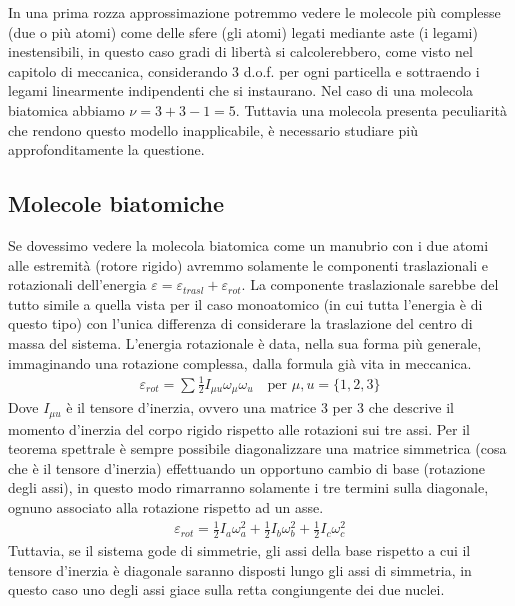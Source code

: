 \documentclass[10pt,a4paper]{article}
\begin{document}
In una prima rozza approssimazione potremmo vedere le molecole più complesse (due o più atomi) come delle sfere (gli atomi) legati mediante aste (i legami) inestensibili, in questo caso gradi di libertà si calcolerebbero, come visto nel capitolo di meccanica, considerando 3 d.o.f. per ogni particella e sottraendo i legami linearmente indipendenti che si instaurano. Nel caso di una molecola biatomica abbiamo $\nu = 3+3-1 = 5$. Tuttavia una molecola presenta peculiarità che rendono questo modello inapplicabile, è necessario studiare più approfonditamente la questione. 
\subsection{Molecole biatomiche}
Se dovessimo vedere la molecola biatomica come un manubrio con i due atomi alle estremità (rotore rigido) avremmo solamente le componenti traslazionali e rotazionali dell'energia \(\varepsilon = \varepsilon_{trasl}+\varepsilon_{rot}\). La componente traslazionale sarebbe del tutto simile a quella vista per il caso monoatomico (in cui tutta l'energia è di questo tipo) con l'unica differenza di considerare la traslazione del centro di massa del sistema. L'energia rotazionale è data, nella sua forma più generale, immaginando una rotazione complessa, dalla formula già vita in meccanica.
\begin{align*} 
 \varepsilon_{rot} = \sum\frac{1}{2} I_{\mu u}\omega_{\mu}\omega_u \quad \text{per } \mu, u = \{1,2,3\}
\end{align*} 
Dove \(I_{\mu u}\) è il tensore d'inerzia, ovvero una matrice 3 per 3 che descrive il momento d'inerzia del corpo rigido rispetto alle rotazioni sui tre assi. Per il teorema spettrale è sempre possibile diagonalizzare una matrice simmetrica (cosa che è il tensore d'inerzia)  effettuando un opportuno cambio di base (rotazione degli assi), in questo modo rimarranno solamente i tre termini sulla diagonale, ognuno associato alla rotazione rispetto ad un asse. 
\begin{align*} 
	\varepsilon_{rot} = \frac{1}{2 }I_a \omega_a^2 + \frac{1}{2 } I_b \omega_b^2 + \frac{1}{2 } I_c \omega_c^2
\end{align*}  
Tuttavia, se il sistema gode di simmetrie, gli assi della base rispetto a cui il tensore d'inerzia è diagonale saranno disposti lungo gli assi di simmetria, in questo caso uno degli assi giace sulla retta congiungente dei due nuclei. 
\end{document}
